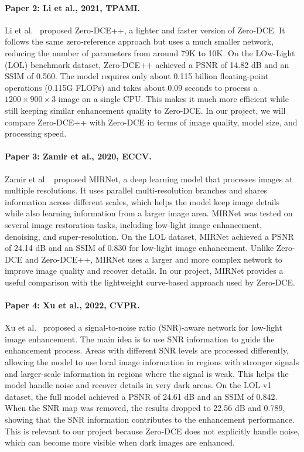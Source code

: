 \documentclass[11pt, letterpaper]{article}
\begin{document}
\paragraph{Paper 2: Li et al., 2021, TPAMI.}
Li et al.~\cite{li2021learning} proposed Zero-DCE++, a lighter and faster version of Zero-DCE. It follows the same zero-reference approach but uses a much smaller network, reducing the number of parameters from around 79K to 10K. On the LOw-Light (LOL) benchmark dataset, Zero-DCE++ achieved a PSNR of 14.82 dB and an SSIM of 0.560. The model requires only about 0.115 billion floating-point operations (0.115G FLOPs) and takes about 0.09 seconds to process a $1200 \times 900 \times 3$ image on a single CPU. This makes it much more efficient while still keeping similar enhancement quality to Zero-DCE. In our project, we will compare Zero-DCE++ with Zero-DCE in terms of image quality, model size, and processing speed.

\paragraph{Paper 3: Zamir et al., 2020, ECCV.}
Zamir et al.~\cite{zamir2020learning} proposed MIRNet, a deep learning model that processes images at multiple resolutions. It uses parallel multi-resolution branches and shares information across different scales, which helps the model keep image details while also learning information from a larger image area. MIRNet was tested on several image restoration tasks, including low-light image enhancement, denoising, and super-resolution. On the LOL dataset, MIRNet achieved a PSNR of 24.14 dB and an SSIM of 0.830 for low-light image enhancement. Unlike Zero-DCE and Zero-DCE++, MIRNet uses a larger and more complex network to improve image quality and recover details. In our project, MIRNet provides a useful comparison with the lightweight curve-based approach used by Zero-DCE.

\paragraph{Paper 4: Xu et al., 2022, CVPR.}
Xu et al.~\cite{xu2022snr} proposed a signal-to-noise ratio (SNR)-aware network for low-light image enhancement. The main idea is to use SNR information to guide the enhancement process. Areas with different SNR levels are processed differently, allowing the model to use local image information in regions with stronger signals and larger-scale information in regions where the signal is weak. This helps the model handle noise and recover details in very dark areas. On the LOL-v1 dataset, the full model achieved a PSNR of 24.61 dB and an SSIM of 0.842. When the SNR map was removed, the results dropped to 22.56 dB and 0.789, showing that the SNR information contributes to the enhancement performance. This is relevant to our project because Zero-DCE does not explicitly handle noise, which can become more visible when dark images are enhanced.
\end{document}
